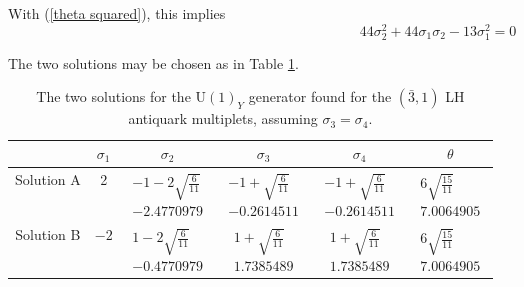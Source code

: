 \documentclass[a4paper,12pt,oneside]{article}
\begin{document}
With (\ref{theta squared}), this implies
\begin{equation}\label{quadratic equation for sigma 2}
44\sigma_2^2+44\sigma_1\sigma_2-13\sigma_1^2=0
\end{equation}

The two solutions may be chosen as in Table \ref{T5}.

\begin{table}
\begin{center}
\begin{tabular}{|c|c|c|c|c|c|}\hline
 & $\sigma_1$ & $\sigma_2$ & $\sigma_3$ & $\sigma_4$ & $\theta$ \\
\hline
Solution A & 2 &
$\begin{array}{c}-1-2\sqrt{\frac{6}{11}} \\
-2.4770979 \end{array}$ &
$\begin{array}{c}-1+\sqrt{\frac{6}{11}} \\
-0.2614511 \end{array}$ &
$\begin{array}{c}-1+\sqrt{\frac{6}{11}} \\
-0.2614511 \end{array}$ &
$\begin{array}{c}6\sqrt{\frac{15}{11}} \\
7.0064905 \end{array}$ \\ \hline
Solution B & $-2$ &
$\begin{array}{c}1-2\sqrt{\frac{6}{11}} \\
-0.4770979 \end{array}$ &
$\begin{array}{c}1+\sqrt{\frac{6}{11}} \\
1.7385489 \end{array}$ &
$\begin{array}{c}1+\sqrt{\frac{6}{11}} \\
1.7385489 \end{array}$ &
$\begin{array}{c}6\sqrt{\frac{15}{11}} \\
7.0064905 \end{array}$ \\ \hline
\end{tabular}
\caption{\label{T5}
The two solutions for the $\mathrm{U}(1)_Y$ generator found for the
$(\bar{3},1)$ LH antiquark multiplets, assuming 
$\sigma_3=\sigma_4$.}
\end{center}
\end{table}
\end{document}
